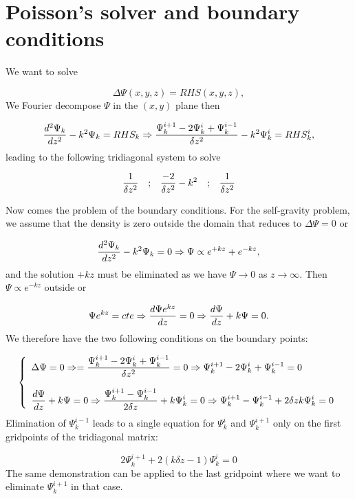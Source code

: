 \documentclass[mathleft]{article}
\begin{document}
\section{Poisson's solver and boundary conditions}

We want to solve 

\[
\Delta \Psi(x,y,z) = RHS (x,y,z),
\]
We Fourier decompose $\Psi$ in the $(x,y)$ plane then

\[
\frac{d^2 \Psi_k}{dz^2} - k^2 \Psi_k = RHS_k \Rightarrow
\frac{\Psi_k^{i+1}-2\Psi_k^{i}+\Psi_k^{i-1}}{\delta z^2} - k^2 \Psi_k^{i}
= RHS^i_k,
\]
leading to the following tridiagonal system to solve

\[
{1\over \delta z^2} \quad \hbox{;} \quad {-2\over \delta z^2} - k^2 \quad \hbox{;} \quad 
{1\over \delta z^2}
\]

Now comes the problem of the boundary conditions. For the self-gravity
problem, we assume that the density is zero outside the domain that
reduces to $\Delta \Psi = 0$ or

\[
\frac{d^2 \Psi_k}{dz^2} - k^2 \Psi_k = 0 \Rightarrow \Psi \propto e^{+kz} +
e^{-kz},
\]
and the solution $+kz$ must be eliminated as we have $\Psi \rightarrow 0$
as $z\rightarrow \infty$. Then $\Psi \propto e^{-kz}$ outside or

\[
\Psi e^{kz} = cte \Rightarrow \frac{d \Psi e^{kz}}{dz} = 0 \Rightarrow
\frac{d \Psi}{dz} + k \Psi = 0.
\]
We therefore have the two following conditions on the boundary points:

\begin{equation}\left\{ \begin{array}{l}
\displaystyle \Delta \Psi = 0 \Rightarrow =
\frac{\Psi_k^{i+1}-2\Psi_k^{i}+\Psi_k^{i-1}}{\delta z^2}  = 0 
\Rightarrow \Psi_k^{i+1}-2\Psi_k^{i}+\Psi_k^{i-1} = 0\\ \\
\displaystyle \frac{d \Psi}{dz} + k \Psi = 0 \Rightarrow
\frac{\Psi_k^{i+1}-\Psi_k^{i-1}}{2\delta z} + k \Psi_k^i = 0
\Rightarrow \Psi_k^{i+1}-\Psi_k^{i-1} + 2\delta z k \Psi_k^i = 0
\end{array}\right.
\end{equation}
Elimination of $\Psi_k^{i-1}$ leads to a single equation for $\Psi_k^i$
and $\Psi_k^{i+1}$ only on the first gridpoints of the tridiagonal matrix:

\[
2\Psi_k^{i+1} + 2(k\delta z -1) \Psi_k^i = 0
\]
The same demonstration can be applied to the last gridpoint where we want
to eliminate $\Psi_k^{i+1}$ in that case.
\end{document}
